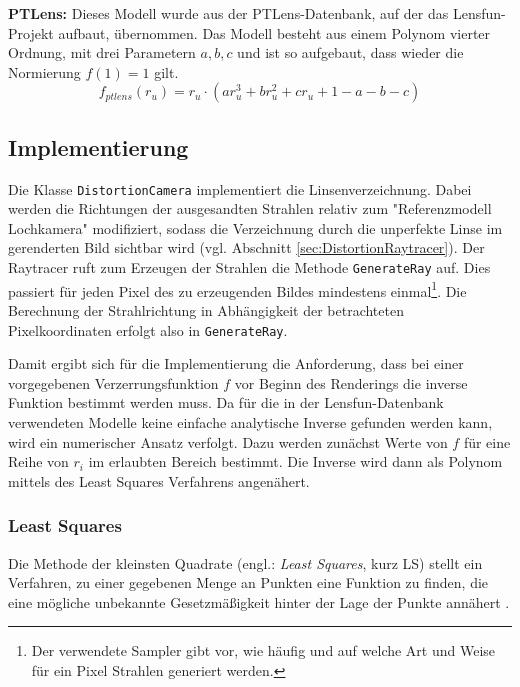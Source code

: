 \textbf{PTLens:} Dieses Modell wurde aus der PTLens-Datenbank, auf der das Lensfun-Projekt aufbaut, übernommen. Das Modell besteht aus einem Polynom vierter Ordnung, mit drei Parametern $a,b,c$ und ist so aufgebaut, dass wieder die Normierung $f(1) = 1$ gilt.
\begin{equation}
	f_{ptlens}(r_u) = r_u \cdot (a r_u^3 + b r_u^2 + c r_u + 1 - a - b - c)
\end{equation}

\subsection{Implementierung}\label{subsec:implementation}

Die Klasse \texttt{DistortionCamera} implementiert die Linsenverzeichnung. Dabei werden die Richtungen der ausgesandten Strahlen relativ zum "Referenzmodell Lochkamera" modifiziert, sodass die Verzeichnung durch die unperfekte Linse im gerenderten Bild sichtbar wird (vgl. Abschnitt \ref{sec:DistortionRaytracer}). Der Raytracer ruft zum Erzeugen der Strahlen die Methode \texttt{GenerateRay} auf. Dies passiert für jeden Pixel des zu erzeugenden Bildes mindestens einmal\footnote{Der verwendete Sampler gibt vor, wie häufig und auf welche Art und Weise für ein Pixel Strahlen generiert werden.}. Die Berechnung der Strahlrichtung in Abhängigkeit der betrachteten Pixelkoordinaten erfolgt also in \texttt{GenerateRay}.

Damit ergibt sich für die Implementierung die Anforderung, dass bei einer vorgegebenen Verzerrungsfunktion $f$ vor Beginn des Renderings die inverse Funktion bestimmt werden muss. Da für die in der Lensfun-Datenbank verwendeten Modelle keine einfache analytische Inverse gefunden werden kann, wird ein numerischer Ansatz verfolgt. Dazu werden zunächst Werte von $f$ für eine Reihe von $r_i$ im erlaubten Bereich bestimmt. Die Inverse wird dann als Polynom mittels des Least Squares Verfahrens angenähert.


\subsubsection{Least Squares}
\label{subsubsec:least}

Die Methode der kleinsten Quadrate (engl.: \emph{Least Squares}, kurz LS) stellt ein Verfahren, zu einer gegebenen Menge an Punkten eine Funktion zu finden, die eine mögliche unbekannte Gesetzmäßigkeit hinter der Lage der Punkte annähert \cite{lsq_wolfram}.

